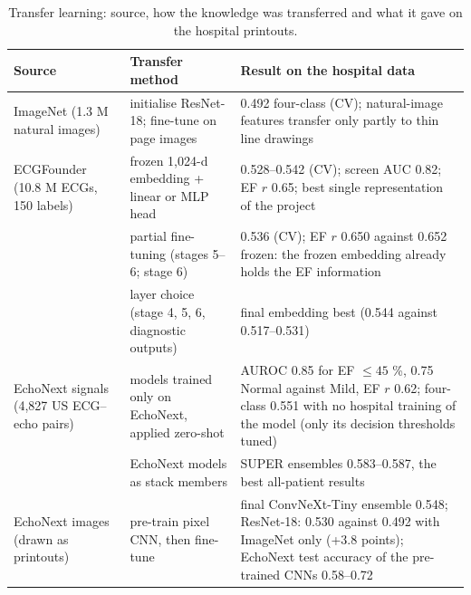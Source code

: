 \begin{table}[htbp]
\caption{Transfer learning: source, how the knowledge was transferred and what it gave on the hospital printouts.}\label{tab:3.4}
\small
\begin{tabular}{>{\raggedright\arraybackslash\hspace{0pt}}p{}>{\raggedright\arraybackslash\hspace{0pt}}p{}>{\raggedright\arraybackslash\hspace{0pt}}p{}}
\toprule
\textbf{Source} & \textbf{Transfer method} & \textbf{Result on the hospital data} \\
\midrule
ImageNet (1.3 M natural images) & initialise ResNet-18; fine-tune on page images & 0.492 four-class (CV); natural-image features transfer only partly to thin line drawings \\
ECGFounder (10.8 M ECGs, 150 labels) & frozen 1,024-d embedding + linear or MLP head & 0.528--0.542 (CV); screen AUC 0.82; EF $r$ 0.65; best single representation of the project \\
 & partial fine-tuning (stages 5--6; stage 6) & 0.536 (CV); EF $r$ 0.650 against 0.652 frozen: the frozen embedding already holds the EF information \\
 & layer choice (stage 4, 5, 6, diagnostic outputs) & final embedding best (0.544 against 0.517--0.531) \\
EchoNext signals (4,827 US ECG-- echo pairs) & models trained only on EchoNext, applied zero-shot & AUROC 0.85 for EF $\le45$ \%, 0.75 Normal against Mild, EF $ r$ 0.62; four-class 0.551 with no hospital training of the model (only its decision thresholds tuned) \\
 & EchoNext models as stack members & SUPER ensembles 0.583--0.587, the best all-patient results \\
EchoNext images (drawn as printouts) & pre-train pixel CNN, then fine-tune & final ConvNeXt-Tiny ensemble 0.548; ResNet-18: 0.530 against 0.492 with ImageNet only (+3.8 points); EchoNext test accuracy of the pre-trained CNNs 0.58--0.72 \\
\bottomrule
\end{tabular}
\end{table}
